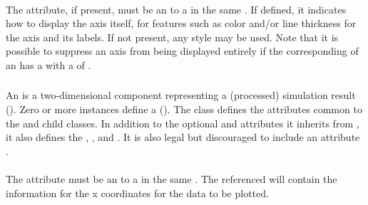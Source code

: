 \begin{blockChanged}
\paragraph*{}
The  attribute, if present, must be an \SIdRef to a \Style in the same \SedDocument.  If defined, it indicates how to display the axis itself, for features such as color and/or line thickness for the axis and its labels.  If not present, any style may be used.  Note that it is possible to suppress an axis from being displayed entirely if the corresponding \Style of an \Axis has a  with a  of .



\subsubsection{}
\label{class:abstractCurve}
An \AbstractCurve is a two-dimensional \Output component representing a (processed) simulation result (). Zero or more \AbstractCurve instances define a \PlotTwo ().  The \AbstractCurve class defines the attributes common to the \Curve and \ShadedArea child classes.  In addition to the optional  and  attributes it inherits from \SedBase, it also defines the  , , and .  It is also legal but discouraged to include an attribute .



\paragraph*{}
The  attribute must be an \SIdRef to a \DataGenerator in the same \SedDocument.  The referenced \DataGenerator will contain the information for the x coordinates for the data to be plotted.  


\end{blockChanged}
